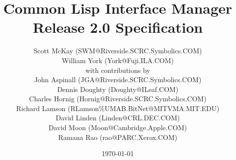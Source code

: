 
\pagestyle{headings}

\title{Common Lisp Interface Manager \\
       Release 2.0 Specification}

\author{Scott McKay ({\tentt SWM@Riverside.SCRC.Symbolics.COM}) \\
        William York ({\tentt York@Fuji.ILA.COM}) \\ 
        {\tenit with contributions by} \\
        {\tenrm John Aspinall ({\tentt JGA@Riverside.SCRC.Symbolics.COM})} \\
        {\tenrm Dennis Doughty ({\tentt Doughty@ILeaf.COM})} \\
        {\tenrm Charles Hornig ({\tentt Hornig@Riverside.SCRC.Symbolics.COM})} \\
        {\tenrm Richard Lamson ({\tentt RLamson\%UMAB.BitNet@MITVMA.MIT.EDU})} \\
        {\tenrm David Linden ({\tentt Linden@CRL.DEC.COM})} \\
        {\tenrm David Moon ({\tentt Moon@Cambridge.Apple.COM})} \\
        {\tenrm Ramana Rao ({\tentt rao@PARC.Xerox.COM})}}

\date{\today}

\makeindex




\newif \ifpsfig \psfigfalse

\addtolength{\oddsidemargin}{-.5in}
\addtolength{\evensidemargin}{-.5in}
\addtolength{\textwidth}{1in}
\addtolength{\topmargin}{-.5in}
\addtolength{\textheight}{1.0in}



\maketitle

\parindent 0pc
\parskip   1pc

\renewcommand{\thepage}{\roman{page}}

\pagebreak
\tableofcontents

\pagebreak


\pagebreak
\setcounter{page}{1}
\renewcommand{\thepage}{\arabic{page}}

